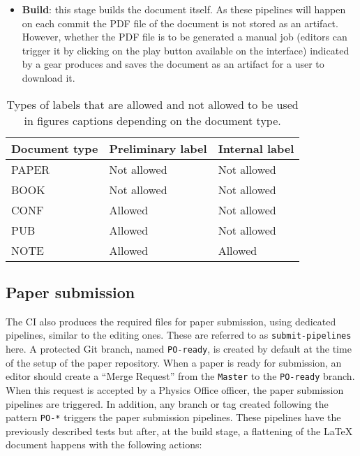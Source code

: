 \begin{itemize}
\item \textbf{Build}: this stage builds the document itself. As these pipelines will happen on each commit the PDF file of the document is not stored as an artifact. However, whether the PDF file is to be generated a manual job (editors can trigger it by clicking on the play button available on the interface) indicated by a gear produces and saves the document as an artifact for a user to download it.
\end{itemize}

\begin{table}[htb]
  \centering
  \begin{tabular}{lll}\toprule
    Document type & Preliminary label & Internal label \\
    \midrule
    PAPER & Not allowed & Not allowed \\
    BOOK & Not allowed & Not allowed \\
    CONF & Allowed & Not allowed \\
    PUB & Allowed & Not allowed \\
    NOTE & Allowed & Allowed \\
    \bottomrule
  \end{tabular}
  \caption{Types of labels that are allowed and not allowed to be used in figures captions depending on the document type.}%
  \label{tab:labels}
\end{table}

\subsection{Paper submission}%
\label{sec:Paper_submission}

The CI also produces the required files for paper submission, using dedicated pipelines, similar to the editing ones.
These are referred to as \texttt{submit-pipelines} here.
A protected Git branch, named \texttt{PO-ready}, is created by default at the time of the setup of the paper repository.
When a paper is ready for submission, an editor should create a \enquote{Merge Request}
from the \texttt{Master} to the \texttt{PO-ready} branch.
When this request is accepted by a Physics Office officer, the paper submission pipelines are triggered.
In addition, any branch or tag created following the pattern \texttt{PO-*} triggers the paper submission pipelines.
These pipelines have the previously described tests but after, at the build stage, a flattening of the LaTeX document happens with the following actions:

